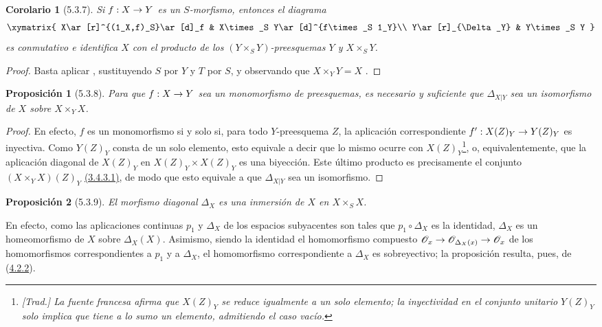 \documentclass[oneside]{amsart}
\theoremstyle{ega-env-style}
\theoremstyle{ega-thm-env-style}
\newtheorem*{proposition}{Proposición}
\newtheorem*{corollary}{Corolario}
\theoremstyle{ega-defn-env-style}
\renewcommand{\to}{\mathchoice{\longrightarrow}{\rightarrow}{\rightarrow}{\rightarrow}}
\let\EGAOriginalLabel\label
\renewcommand{\label}[1]{\phantomsection\EGAOriginalLabel{#1}}
\begin{document}
\begin{corollary}[5.3.7]
\label{I.5.3.7}
Si $f:X\to Y$ es un $S$-morfismo, entonces el diagrama
\[
  \xymatrix{
    X\ar[r]^{(1_X,f)_S}\ar[d]_f &
    X\times_S Y\ar[d]^{f\times_S 1_Y}\\
    Y\ar[r]_{\Delta_Y} &
    Y\times_S Y
  }
\]
es conmutativo e identifica $X$ con el producto de los $(Y\times_S Y)$-preesquemas $Y$ y $X\times_S Y$.
\end{corollary}

\begin{proof}
Basta aplicar , sustituyendo $S$ por $Y$ y $T$ por $S$, y observando que $X\times_Y Y=X$ .
\end{proof}

\begin{proposition}[5.3.8]
\label{I.5.3.8}
Para que $f:X\to Y$ sea un monomorfismo de preesquemas, es necesario y suficiente que $\Delta_{X|Y}$ sea un isomorfismo de $X$ sobre $X\times_Y X$.
\end{proposition}

\begin{proof}
En efecto, $f$ es un monomorfismo si y solo si, para todo $Y$-preesquema $Z$, la aplicación correspondiente $f':X(Z)_Y\to Y(Z)_Y$ es inyectiva.
Como $Y(Z)_Y$ consta de un solo elemento, esto equivale a decir que lo mismo ocurre con $X(Z)_Y$\footnote{\emph{[Trad.] La fuente francesa afirma que $X(Z)_Y$ se reduce igualmente a un solo elemento; la inyectividad en el conjunto unitario $Y(Z)_Y$ solo implica que tiene a lo sumo un elemento, admitiendo el caso vacío.}}, o, equivalentemente, que la aplicación diagonal de $X(Z)_Y$ en $X(Z)_Y\times X(Z)_Y$ es una biyección.
Este último producto es precisamente el conjunto $(X\times_Y X)(Z)_Y$ \hyperref[I.3.4.3.1-fr]{(3.4.3.1)}, de modo que esto equivale a que $\Delta_{X|Y}$ sea un isomorfismo.
\end{proof}

\begin{proposition}[5.3.9]
\label{I.5.3.9-fr}
El morfismo diagonal $\Delta_X$ es una inmersión de $X$ en
$X\times_S X$.
\end{proposition}

En efecto, como las aplicaciones continuas $p_1$ y $\Delta_X$ de los espacios
subyacentes son tales que $p_1\circ\Delta_X$ es la identidad, $\Delta_X$
es un homeomorfismo de $X$ sobre $\Delta_X(X)$. Asimismo, siendo la identidad el homomorfismo
compuesto
$\mathscr{O}_x\to\mathscr{O}_{\Delta_X(x)}\to\mathscr{O}_x$ de los
homomorfismos correspondientes a $p_1$ y a $\Delta_X$,
el homomorfismo correspondiente a $\Delta_X$ es sobreyectivo; la proposición
resulta, pues, de (\hyperref[I.4.2.2-fr]{4.2.2}).
\end{document}

